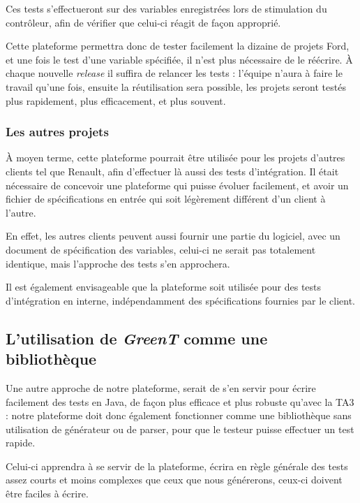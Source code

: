 	Ces tests s'effectueront sur des variables enregistrées lors de stimulation du contrôleur, afin de vérifier que celui-ci réagit de façon approprié.

	Cette plateforme permettra donc de tester facilement la dizaine de projets Ford, et une fois le test d'une variable spécifiée, il n'est plus nécessaire de le réécrire. À chaque nouvelle \textit{release} il suffira de relancer les tests : l'équipe n'aura à faire le travail qu'une fois, ensuite la réutilisation sera possible, les projets seront testés plus rapidement, plus efficacement, et plus souvent.

	\subsubsection{Les autres projets}
	À moyen terme, cette plateforme pourrait être utilisée pour les projets d'autres clients tel que Renault, afin d'effectuer là aussi des tests d'intégration. Il était nécessaire de concevoir une plateforme qui puisse évoluer facilement, et avoir un fichier de spécifications en entrée qui soit légèrement différent d'un client à l'autre.

	En effet, les autres clients peuvent aussi fournir une partie du logiciel, avec un document de spécification des variables, celui-ci ne serait pas totalement identique, mais l'approche des tests s'en approchera.

	Il est également envisageable que la plateforme soit utilisée pour des tests d'intégration en interne, indépendamment des spécifications fournies par le client.

	\subsection{L'utilisation de \textit{GreenT} comme une bibliothèque}
		Une autre approche de notre plateforme, serait de s'en servir pour écrire facilement des tests en Java, de façon plus efficace et plus robuste qu'avec la TA3 : notre plateforme doit donc également fonctionner comme une bibliothèque sans utilisation de générateur ou de parser, pour que le testeur puisse effectuer un test rapide. 

		Celui-ci apprendra à se servir de la plateforme, écrira en règle générale des tests assez courts et moins complexes que ceux que nous générerons, ceux-ci doivent être faciles à écrire.

%

